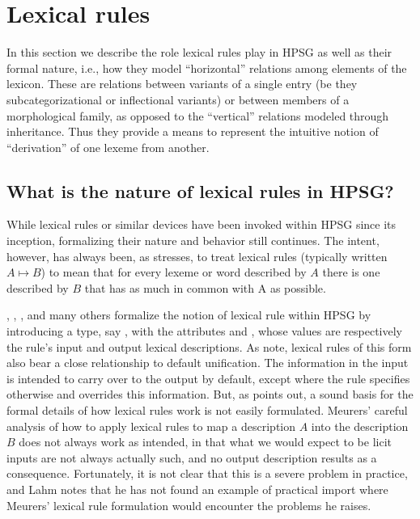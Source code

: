 \documentclass[output=paper
 	        ,biblatex
                ,babelshorthands
                ,newtxmath
                ,draftmode
                ,colorlinks, citecolor=brown
]{langscibook}
\begin{document}
\section{Lexical rules}
\label{lexicon-sec-lexical-rules}


In this section we describe the role lexical rules play in HPSG as well as their formal nature, i.e., how they model ``horizontal'' relations among elements of the lexicon. These are relations between variants of a single entry (be they subcategorizational or inflectional variants) or between members of a morphological family, as opposed to the ``vertical'' relations modeled through inheritance. Thus they provide a means to represent the intuitive notion of ``derivation'' of one lexeme from another. 

\subsection{What is the nature of lexical rules in HPSG?}
\label{lexicon-sec-nature-of-lexical-rules}

While lexical rules or similar devices have been invoked within HPSG since its inception, formalizing their nature and behavior still  continues.
The intent, however, has always been, as \citet{Lahm2016} stresses, to treat lexical rules (typically written $A \mapsto B$) to mean that for every lexeme or word described by $A$ there is one described by $B$ that has as much in common with A as possible.

\citet{CopestakeandBriscoe1991}, \citet{BriscoeandCopestake1999}, \citet{Meurers2001}, and many others formalize the notion of lexical rule within HPSG by introducing a type, say , with the attributes  and , whose values are respectively the rule's input and output lexical descriptions. As \citet{BriscoeandCopestake1999} note, lexical rules of this form also bear a close relationship to default unification.
The information in the input is intended to carry over to the output by default, except where the rule specifies otherwise and overrides this information. But, as \citet{Lahm2016} points out, a sound basis for the formal details of how lexical rules work is not easily formulated. Meurers' careful analysis of how to apply lexical rules to map a description $A$ into the description $B$ does not always work as intended, in that what we would expect to be licit inputs are not always actually such, and no output description results as a consequence. Fortunately,  it is not clear that this is a severe problem in practice, and Lahm notes that he has not found an example of practical import where Meurers' lexical rule formulation would encounter the problems he raises.
\end{document}
